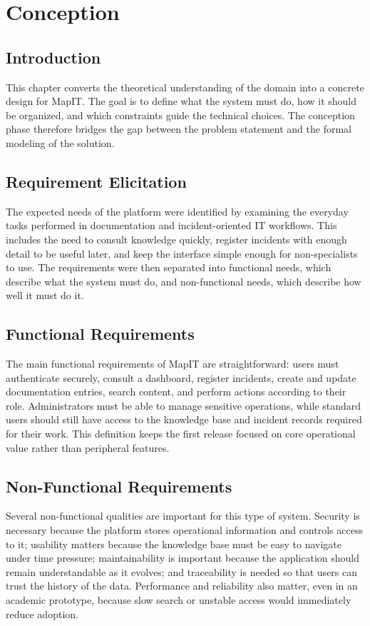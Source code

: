 \chapter{Conception}

\section{Introduction}
This chapter converts the theoretical understanding of the domain into a concrete design for MapIT. The goal is to define what the system must do, how it should be organized, and which constraints guide the technical choices. The conception phase therefore bridges the gap between the problem statement and the formal modeling of the solution.

\section{Requirement Elicitation}
The expected needs of the platform were identified by examining the everyday tasks performed in documentation and incident-oriented IT workflows. This includes the need to consult knowledge quickly, register incidents with enough detail to be useful later, and keep the interface simple enough for non-specialists to use. The requirements were then separated into functional needs, which describe what the system must do, and non-functional needs, which describe how well it must do it.

\section{Functional Requirements}
The main functional requirements of MapIT are straightforward: users must authenticate securely, consult a dashboard, register incidents, create and update documentation entries, search content, and perform actions according to their role. Administrators must be able to manage sensitive operations, while standard users should still have access to the knowledge base and incident records required for their work. This definition keeps the first release focused on core operational value rather than peripheral features.

\section{Non-Functional Requirements}
Several non-functional qualities are important for this type of system. Security is necessary because the platform stores operational information and controls access to it; usability matters because the knowledge base must be easy to navigate under time pressure; maintainability is important because the application should remain understandable as it evolves; and traceability is needed so that users can trust the history of the data. Performance and reliability also matter, even in an academic prototype, because slow search or unstable access would immediately reduce adoption.

